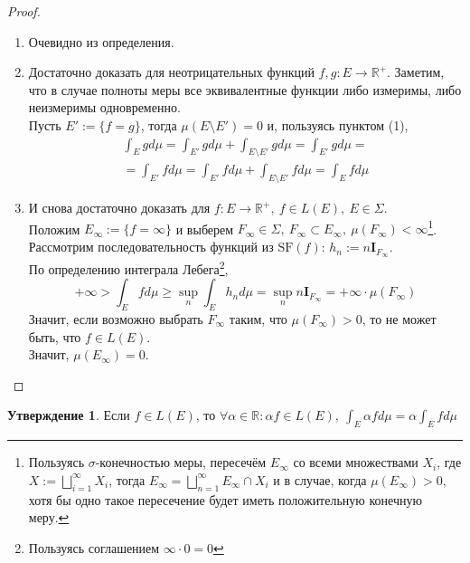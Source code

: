 \documentclass[11pt,a4paper]{report}
\def\Real{\mathbb{R}}
\theoremstyle{definition}
\theoremstyle{definition}
\newtheorem{preposition}{Утверждение}[section]
\theoremstyle{definition}
\begin{document}
		\begin{proof}$  $
			\begin{enumerate}[(1)]
				\item Очевидно из определения.
				\item Достаточно доказать для неотрицательных функций $ f, g: E \to \Real^{+} $. Заметим, что в случае полноты меры все эквивалентные функции либо измеримы, либо неизмеримы одновременно.\\
				Пусть $ E' := \{ f = g \} $, тогда $ \mu(E \setminus E') = 0 $ и, пользуясь пунктом (1),
				\begin{gather*}
					\int_{E} g d\mu = \int_{E'} g d\mu + \int_{E \setminus E'} g d\mu = \int_{E'} g d\mu =\\= \int_{E'} f d\mu = \int_{E'} f d\mu + \int_{E \setminus E'} f d\mu = \int_{E} f d\mu
				\end{gather*}
				\item И снова достаточно доказать для $ f: E \to \Real^{+},\ f \in L(E),\ E \in \Sigma $.\\
				Положим $ E_{\infty} := \{ f = \infty \} $ и выберем $ F_{\infty} \in \Sigma,\ F_{\infty} \subset E_{\infty},\ \mu(F_{\infty}) < \infty $\footnote{Пользуясь $ \sigma $-конечностью меры, пересечём $ E_{\infty} $ со всеми множествами $ X_{i} $, где $ X := \bigsqcup\limits_{i=1}^{\infty} X_{i} $, тогда $ E_{\infty} = \bigsqcup\limits_{n=1}^{\infty} E_{\infty} \cap X_{i} $ и в случае, когда $ \mu(E_{\infty}) > 0 $, хотя бы одно такое пересечение будет иметь положительную конечную меру.}.\\
				Рассмотрим последовательность функций из $ \mbox{SF}(f) $: $ h_{n} := n \mathbf{I}_{F_{\infty}} $.\\
				По определению интеграла Лебега\footnote{Пользуясь соглашением $ \infty \cdot 0 = 0 $}, 
				\[ +\infty > \int_{E} f d\mu \ge \sup\limits_{n} \int_{E} h_{n} d\mu = \sup\limits_{n} n \mathbf{I}_{F_{\infty}} = +\infty \cdot \mu(F_{\infty}) \]
				Значит, если возможно выбрать $ F_{\infty} $ таким, что $ \mu(F_{\infty}) > 0 $, то не может быть, что $ f \in L(E) $.\\
				Значит, $ \mu(E_{\infty}) = 0 $.
			\end{enumerate}
		\end{proof}
		\begin{preposition}
			Если $ f \in L(E) $, то $ \forall \alpha \in \Real: \alpha f \in L(E),\ \int_{E} \alpha f d\mu = \alpha \int_{E} f d\mu $
		\end{preposition}
\end{document}
